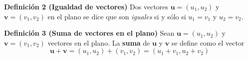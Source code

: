 \begin{frame}%

\vspace{-1mm}

\begin{block}{\textbf{Definición 2 (Igualdad de vectores)}}
	\justifying
	Dos vectores $\mathbf{u}=(u_1,u_2)$ y $\mathbf{v}=(v_1,v_2)$ en el plano se dice que son \textit{iguales}
	si y sólo si $u_1=v_1$ y $u_2=v_2$.
\end{block}

\vspace{-1mm}

\begin{block}{\textbf{Definición 3 (Suma de vectores en el plano)}}
	\justifying
	Sean $\mathbf{u}=(u_1,u_2)$ y $\mathbf{v}=(v_1,v_2)$ vectores en el plano.
	La \textbf{suma} de $\mathbf{u}$ y $\mathbf{v}$ se define como el vector
	\[
	\mathbf{u+v} = (u_1,u_2) + (v_1,v_2) = (u_1+v_1,u_2+v_2)
	\]
\end{block}


\end{frame}

